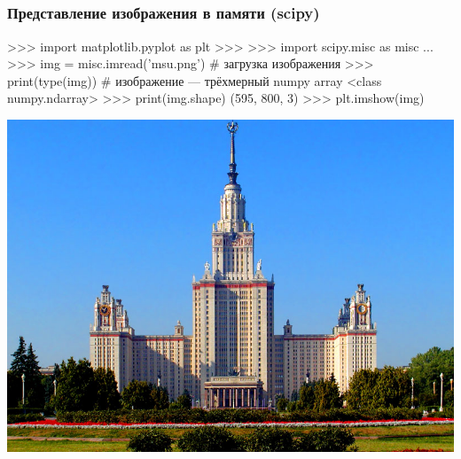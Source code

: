 \documentclass[fleqn, xcolor=x11names]{beamer}
\begin{document}
\subsection*{}

\begin{frame}[fragile]\frametitle{Представление изображения в памяти (scipy)}
\begin{pcode}
>>> import matplotlib.pyplot as plt
>>> %
>>> import scipy.misc as misc
...
>>> img = misc.imread('msu.png') # загрузка изображения
>>> print(type(img))  # изображение — трёхмерный numpy array
<class numpy.ndarray>
>>> print(img.shape)
(595, 800, 3)
>>> plt.imshow(img)
\end{pcode}

\includegraphics[scale=0.3]{images/msu.png}
\end{frame}
\end{document}
